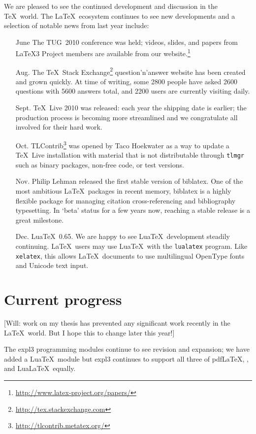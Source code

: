 \documentclass{ltnews}
\begin{document}
We are pleased to see the continued development and discussion in the \TeX\ world.
The \LaTeX\ ecosystem continues to see new developments and a selection of notable news from last year include:
\begin{itemize}
\item[June] The TUG~2010 conference was held; videos, slides, and papers from \LaTeX3 Project members are available from our website.\footnote{\url{http://www.latex-project.org/papers/}}
\item[Aug.] 
The \TeX\ Stack Exchange\footnote{\url{http://tex.stackexchange.com}} question'n'answer website has been created and grown quickly. At time of writing, some 2800 people have asked 2600 questions with 5600 answers total, and 2200 users are currently visiting daily.
\item[Sept.] \TeX\ Live 2010 was released: each year the shipping date is earlier; the production process is becoming more streamlined and we congratulate all involved for their hard work.
\item[Oct.] TLContrib\footnote{\url{http://tlcontrib.metatex.org/}} was opened by Taco Hoekwater as a way to update a \TeX~Live installation with material that is not distributable through \verb|tlmgr| such as binary packages, non-free code, or test versions.
\item[Nov.] Philip Lehman released the first stable version of \textsf{biblatex}. One of the most ambitious \LaTeX\ packages in recent memory, \textsf{biblatex} is a highly flexible package for managing citation cross-referencing and bibliography typesetting. In `beta' status for a few years now, reaching a stable release is a great milestone.
\item[Dec.] Lua\TeX\ 0.65. We are happy to see Lua\TeX\ development steadily continuing. \LaTeX\ users may use Lua\TeX\ with the \verb|lualatex| program. Like \verb|xelatex|, this allows \LaTeX\ documents to use multilingual OpenType fonts and Unicode text input.
\end{itemize}

\section{Current progress}

[Will: work on my thesis has prevented any significant work recently in the \LaTeX\ world. But I hope this to change later this year!]

The \textsf{expl3} programming modules continue to see revision and expansion; we have added a Lua\TeX\ module but \textsf{expl3} continues to support all three of pdf\LaTeX, \XeLaTeX, and Lua\LaTeX\ equally.
\end{document}
